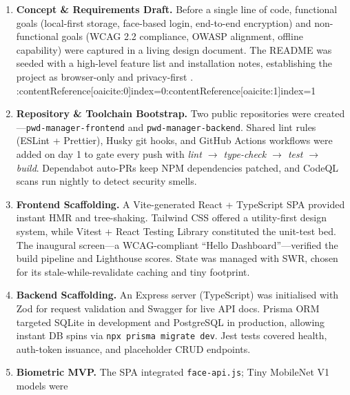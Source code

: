 \begin{enumerate}[leftmargin=*,label=\textbf{Phase \arabic*}]
\item \textbf{Concept \& Requirements Draft.}  
      Before a single line of code, functional goals (local-first storage,
      face-based login, end-to-end encryption) and non-functional goals
      (WCAG 2.2 compliance, OWASP alignment, offline capability) were captured
      in a living design document.  The README was seeded with a high-level
      feature list and installation notes, establishing the project as
      browser-only and privacy-first \autocite{README2025}. :contentReference[oaicite:0]{index=0}:contentReference[oaicite:1]{index=1}
\item \textbf{Repository \& Toolchain Bootstrap.}  
      Two public repositories were created—\texttt{pwd-manager-frontend} and
      \texttt{pwd-manager-backend}.  Shared lint rules (ESLint + Prettier),
      Husky git hooks, and GitHub Actions workflows were added on day 1 to
      gate every push with \emph{lint $\to$ type-check $\to$ test $\to$
      build}.  Dependabot auto-PRs keep NPM dependencies patched, and
      CodeQL scans run nightly to detect security smells.
\item \textbf{Frontend Scaffolding.}  
      A Vite-generated React + TypeScript SPA provided instant HMR and
      tree-shaking.  Tailwind CSS offered a utility-first design system,
      while Vitest + React Testing Library constituted the unit-test bed.  The
      inaugural screen—a WCAG-compliant “Hello Dashboard”—verified the build
      pipeline and Lighthouse scores.  State was managed with SWR, chosen for
      its stale-while-revalidate caching and tiny footprint.
\item \textbf{Backend Scaffolding.}  
      An Express server (TypeScript) was initialised with Zod for request
      validation and Swagger for live API docs.  Prisma ORM targeted SQLite
      in development and PostgreSQL in production, allowing instant DB spins
      via \texttt{npx prisma migrate dev}.  Jest tests covered health,
      auth-token issuance, and placeholder CRUD endpoints.
\item \textbf{Biometric MVP.}  
      The SPA integrated \texttt{face-api.js}; Tiny MobileNet V1 models were

\end{enumerate}
